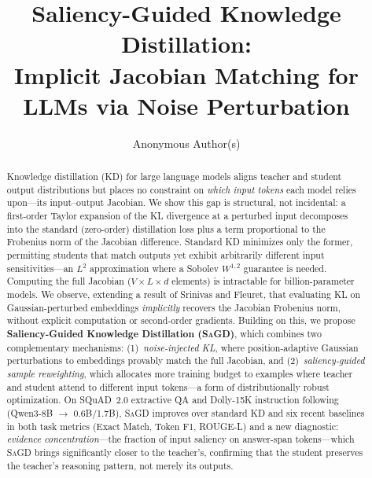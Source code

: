 \documentclass{article}
\title{Saliency-Guided Knowledge Distillation:\\Implicit Jacobian Matching for LLMs via Noise Perturbation}
\author{%
  Anonymous Author(s)
}
\newcommand{\sagd}{\textsc{SaGD}}
\begin{document}
\maketitle

\begin{abstract}
Knowledge distillation (KD) for large language models aligns teacher and student output distributions but places no constraint on \emph{which input tokens} each model relies upon---its input--output Jacobian.
We show this gap is structural, not incidental: a first-order Taylor expansion of the KL divergence at a perturbed input decomposes into the standard (zero-order) distillation loss plus a term proportional to the Frobenius norm of the Jacobian difference.
Standard KD minimizes only the former, permitting students that match outputs yet exhibit arbitrarily different input sensitivities---an $L^2$ approximation where a Sobolev $W^{1,2}$ guarantee is needed.
Computing the full Jacobian ($V \times L \times d$ elements) is intractable for billion-parameter models.
We observe, extending a result of Srinivas and Fleuret, that evaluating KL on Gaussian-perturbed embeddings \emph{implicitly} recovers the Jacobian Frobenius norm, without explicit computation or second-order gradients.
Building on this, we propose \textbf{Saliency-Guided Knowledge Distillation (\sagd{})}, which combines two complementary mechanisms: (1)~\emph{noise-injected KL}, where position-adaptive Gaussian perturbations to embeddings provably match the full Jacobian, and (2)~\emph{saliency-guided sample reweighting}, which allocates more training budget to examples where teacher and student attend to different input tokens---a form of distributionally robust optimization.
On SQuAD~2.0 extractive QA and Dolly-15K instruction following (Qwen3-8B $\to$ 0.6B/1.7B), \sagd{} improves over standard KD and six recent baselines in both task metrics (Exact Match, Token F1, ROUGE-L) and a new diagnostic: \emph{evidence concentration}---the fraction of input saliency on answer-span tokens---which \sagd{} brings significantly closer to the teacher's, confirming that the student preserves the teacher's reasoning pattern, not merely its outputs.
\end{abstract}










\appendix


\newpage

\end{document}
